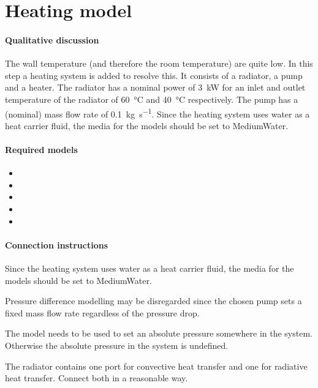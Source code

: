 \documentclass[10pt,a4paper]{article}
\begin{document}
\section{Heating model}
\paragraph{Qualitative discussion}
The wall temperature (and therefore the room temperature) are quite low. 
In this step a heating system is added to resolve this.
It consists of a radiator, a pump and a heater.
The radiator has a nominal power of \SI{3}{\kilo\watt} for an inlet and outlet temperature of the radiator of \SI{60}{\degreeCelsius} and \SI{40}{\degreeCelsius} respectively.
The pump has a (nominal) mass flow rate of \SI{0.1}{\kilogram\per\second}.
Since the heating system uses water as a heat carrier fluid, 
the media for the models should be set to MediumWater.

\paragraph{Required models}
\begin{itemize}
\item {}
\item {}
\item {}
\item {}
\item {}
\end{itemize}

\paragraph{Connection instructions}
Since the heating system uses water as a heat carrier fluid, 
the media for the models should be set to MediumWater.

Pressure difference modelling may be disregarded since the chosen pump
sets a fixed mass flow rate regardless of the pressure drop.

The  model needs to be used to set an absolute
pressure somewhere in the system. 
Otherwise the absolute 
pressure in the system is undefined.

The radiator contains one port for convective 
heat transfer and one for radiative heat transfer.
Connect both in a reasonable way.
\end{document}

